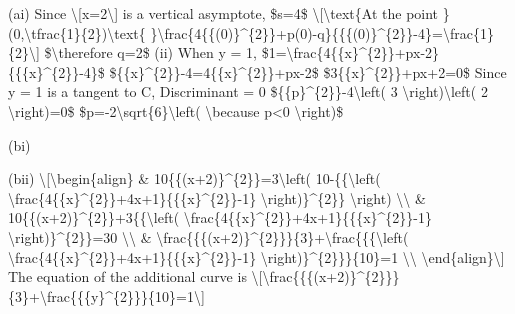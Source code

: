 \item (ai) Since \textbackslash{[}x=2\textbackslash{]} is a vertical
asymptote, \$s=4\$ \textbackslash{[}\textbackslash text\{At the
point \}(0,\textbackslash tfrac\{1\}\{2\})\textbackslash text\{
\}\textbackslash frac\{4\{\{(0)\}\textasciicircum\{2\}\}+p(0)-q\}\{\{\{(0)\}\textasciicircum\{2\}\}-4\}=\textbackslash frac\{1\}\{2\}\textbackslash{]}
\$\textbackslash therefore q=2\$ (ii) When y = 1, \$1=\textbackslash frac\{4\{\{x\}\textasciicircum\{2\}\}+px-2\}\{\{\{x\}\textasciicircum\{2\}\}-4\}\$
\$\{\{x\}\textasciicircum\{2\}\}-4=4\{\{x\}\textasciicircum\{2\}\}+px-2\$
\$3\{\{x\}\textasciicircum\{2\}\}+px+2=0\$ Since y = 1 is a tangent
to C, Discriminant = 0 \$\{\{p\}\textasciicircum\{2\}\}-4\textbackslash left(
3 \textbackslash right)\textbackslash left( 2 \textbackslash right)=0\$
\$p=-2\textbackslash sqrt\{6\}\textbackslash left( \textbackslash because
p<0 \textbackslash right)\$ 

(bi)

(bii) \textbackslash{[}\textbackslash begin\{align\} \& 10\{\{(x+2)\}\textasciicircum\{2\}\}=3\textbackslash left(
10-\{\{\textbackslash left( \textbackslash frac\{4\{\{x\}\textasciicircum\{2\}\}+4x+1\}\{\{\{x\}\textasciicircum\{2\}\}-1\}
\textbackslash right)\}\textasciicircum\{2\}\} \textbackslash right)
\textbackslash\textbackslash{} \& 10\{\{(x+2)\}\textasciicircum\{2\}\}+3\{\{\textbackslash left(
\textbackslash frac\{4\{\{x\}\textasciicircum\{2\}\}+4x+1\}\{\{\{x\}\textasciicircum\{2\}\}-1\}
\textbackslash right)\}\textasciicircum\{2\}\}=30 \textbackslash\textbackslash{}
\& \textbackslash frac\{\{\{(x+2)\}\textasciicircum\{2\}\}\}\{3\}+\textbackslash frac\{\{\{\textbackslash left(
\textbackslash frac\{4\{\{x\}\textasciicircum\{2\}\}+4x+1\}\{\{\{x\}\textasciicircum\{2\}\}-1\}
\textbackslash right)\}\textasciicircum\{2\}\}\}\{10\}=1 \textbackslash\textbackslash{}
\textbackslash end\{align\}\textbackslash{]} The equation of the
additional curve is \textbackslash{[}\textbackslash frac\{\{\{(x+2)\}\textasciicircum\{2\}\}\}\{3\}+\textbackslash frac\{\{\{y\}\textasciicircum\{2\}\}\}\{10\}=1\textbackslash{]}